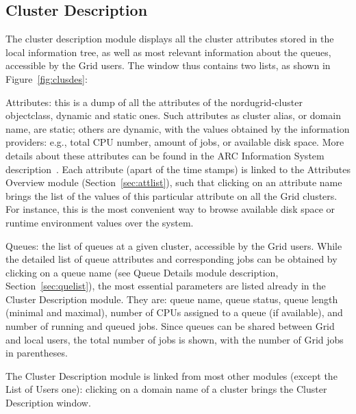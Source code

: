 \documentclass{article}
\begin{document}
\subsection{Cluster Description}
\label{sec:clusdes}

The cluster description  module displays all the
cluster attributes stored in the local information tree, as well as most
relevant
information about the queues, accessible by the Grid users. The
window thus contains two lists, as shown in Figure~\ref{fig:clusdes}:

\begin{list}{)}{ \itemsep=-0.5mm}
\item \textsf{Attributes}:  this is a dump
  of all the attributes of the \textsf{nordugrid-cluster} objectclass,
  dynamic and static ones. Such attributes as cluster alias, or domain
  name, are static; others are dynamic, with the values obtained by
  the information providers: e.g., total CPU number,
  amount of jobs, or available disk space. More details about these
  attributes can be found in the ARC Information System
  description~\cite{is}. Each attribute (apart of the time stamps)
  is linked to the Attributes Overview module
  (Section~\ref{sec:attlist}), such that clicking on an attribute name
  brings the list of the values of this particular attribute on all
  the Grid clusters. For instance, this is the most convenient
  way to browse available disk space  or runtime
  environment values over the system.
\item \textsf{Queues}:  the list of queues at a
  given cluster, accessible by the Grid users. While the detailed
  list of queue attributes and corresponding jobs can be obtained by
  clicking on a queue name (see Queue Details module description,
  Section~\ref{sec:quelist}), the most essential parameters are listed
  already in the Cluster Description module. They are: queue name,
   queue status, queue length 
  (minimal and maximal), number of CPUs assigned to a queue (if
  available), and number of running and queued jobs. Since queues can
  be shared between Grid and local users, the total number of jobs is
  shown, with the number of Grid jobs in parentheses.
\end{list}

The Cluster Description module is linked from most other modules (except
the List of Users one): clicking on a domain name of a cluster brings
the Cluster Description window.
\end{document}
